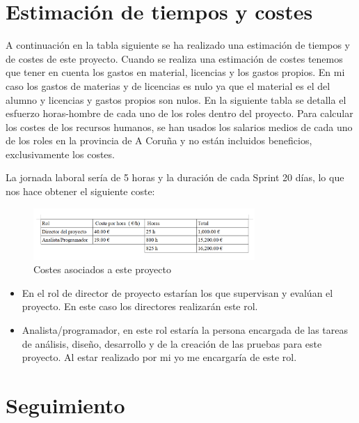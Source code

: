 \section{Estimación de tiempos y costes}
 A continuación en la tabla siguiente se ha realizado una estimación de tiempos y de costes de este proyecto.
 Cuando se realiza una estimación de costes tenemos que tener en cuenta los gastos en material, licencias y los gastos propios. En mi caso los gastos de materias y de licencias es nulo ya que el material es el del alumno y licencias y gastos propios son nulos.
 En la siguiente tabla se detalla el esfuerzo horas-hombre de cada uno de los roles dentro del proyecto. Para calcular los costes de los recursos humanos, se han usados los salarios medios de cada uno de los roles en la provincia de A Coruña y no están incluidos beneficios, exclusivamente los costes. 
 
 La jornada laboral sería de 5 horas y la duración de cada Sprint 20 días, lo que nos hace obtener el siguiente coste:


\begin{figure}[H]
		\centering
		\includegraphics[width=0.75\textwidth] {coste.png}
		\caption{Costes asociados a este proyecto }
	\end{figure}






\begin{itemize}
\item En el rol de director de proyecto estarían los que 
supervisan y evalúan el proyecto. En este caso los directores realizarán este rol.

\item Analista/programador, en este rol estaría la persona encargada de las tareas de análisis, diseño, desarrollo y de la creación de las pruebas para este proyecto. Al estar realizado por mi yo me encargaría de este rol.





\end{itemize}
\section{Seguimiento}

